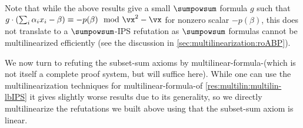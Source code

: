 \documentclass[11pt]{article}
\numberwithin{equation}{section}
\theoremstyle{definition}
\theoremstyle{plain}
\begin{document}
Note that while the above results give a small $\sumpowsum$ formula $g$ such that $g\cdot (\sum_i\alpha_i x_i-\beta)\equiv -p(\beta)\mod\vx^2-\vx$ for nonzero scalar $-p(\beta)$, this does not translate to a $\sumpowsum$-IPS refutation as $\sumpowsum$ formulas cannot be multilinearized efficiently (see the discussion in \autoref{sec:multilinearization:roABP}).

We now turn to refuting the subset-sum axioms by multilinear-formula-\lIPS (which is not itself a complete proof system, but will suffice here).  While one can use the multilinearization techniques for multilinear-formula-\lbIPS of \autoref{res:multilin:multilin-lbIPS} it gives slightly worse results due to its generality, so we directly multilinearize the refutations we built above using that the subset-sum axiom is linear.
\end{document}
